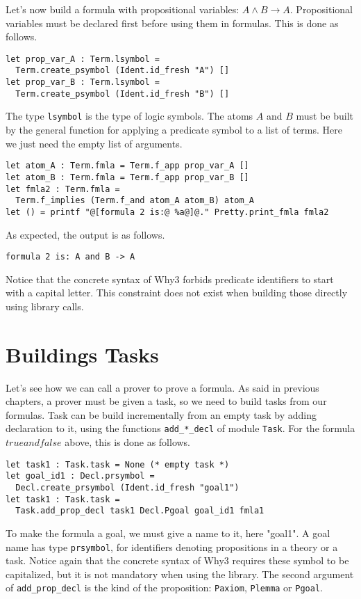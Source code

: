 Let's now build a formula with propositional variables: $A \land B
\rightarrow A$. Propositional variables must be declared first before
using them in formulas. This is done as follows.
\begin{verbatim}
let prop_var_A : Term.lsymbol = 
  Term.create_psymbol (Ident.id_fresh "A") []
let prop_var_B : Term.lsymbol = 
  Term.create_psymbol (Ident.id_fresh "B") []
\end{verbatim}
The type \texttt{lsymbol} is the type of logic symbols. The atoms $A$ and $B$
must be built by the general function for applying a predicate symbol to a list of terms. Here we just need the empty list of arguments.
\begin{verbatim}
let atom_A : Term.fmla = Term.f_app prop_var_A []
let atom_B : Term.fmla = Term.f_app prop_var_B []
let fmla2 : Term.fmla = 
  Term.f_implies (Term.f_and atom_A atom_B) atom_A
let () = printf "@[formula 2 is:@ %a@]@." Pretty.print_fmla fmla2
\end{verbatim}

As expected, the output is as follows.
\begin{verbatim}
formula 2 is: A and B -> A
\end{verbatim}
Notice that the concrete syntax of Why3 forbids predicate identifiers
to start with a capital letter. This constraint does not exist when
building those directly using library calls.

\section{Buildings Tasks}

Let's see how we can call a prover to prove a formula. As said in
previous chapters, a prover must be given a task, so we need to build
tasks from our formulas. Task can be build incrementally from an empty
task by adding declaration to it, using the functions
\texttt{add\_*\_decl} of module \texttt{Task}. For the formula $true and
false$ above, this is done as follows.
\begin{verbatim}
let task1 : Task.task = None (* empty task *)
let goal_id1 : Decl.prsymbol = 
  Decl.create_prsymbol (Ident.id_fresh "goal1") 
let task1 : Task.task = 
  Task.add_prop_decl task1 Decl.Pgoal goal_id1 fmla1
\end{verbatim}
To make the formula a goal, we must give a name to it, here "goal1". A
goal name has type \texttt{prsymbol}, for identifiers denoting
propositions in a theory or a task. Notice again that the concrete
syntax of Why3 requires these symbol to be capitalized, but it is not
mandatory when using the library. The second argument of
\texttt{add\_prop\_decl} is the kind of the proposition:
\texttt{Paxiom}, \texttt{Plemma} or \texttt{Pgoal}.


